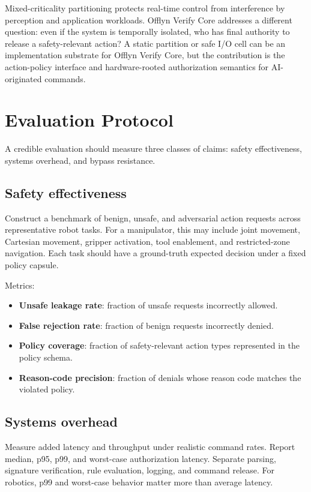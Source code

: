 \documentclass[10pt]{article}
\newcommand{\ovc}{Offlyn Verify Core\xspace}
\begin{document}
Mixed-criticality partitioning protects real-time control from interference by perception and application workloads. \ovc addresses a different question: even if the system is temporally isolated, who has final authority to release a safety-relevant action? A static partition or safe I/O cell can be an implementation substrate for \ovc, but the contribution is the action-policy interface and hardware-rooted authorization semantics for AI-originated commands.

\section{Evaluation Protocol}

A credible evaluation should measure three classes of claims: safety effectiveness, systems overhead, and bypass resistance.

\subsection{Safety effectiveness}

Construct a benchmark of benign, unsafe, and adversarial action requests across representative robot tasks. For a manipulator, this may include joint movement, Cartesian movement, gripper activation, tool enablement, and restricted-zone navigation. Each task should have a ground-truth expected decision under a fixed policy capsule.

Metrics:

\begin{itemize}[leftmargin=*]
  \item \textbf{Unsafe leakage rate}: fraction of unsafe requests incorrectly allowed.
  \item \textbf{False rejection rate}: fraction of benign requests incorrectly denied.
  \item \textbf{Policy coverage}: fraction of safety-relevant action types represented in the policy schema.
  \item \textbf{Reason-code precision}: fraction of denials whose reason code matches the violated policy.
\end{itemize}

\subsection{Systems overhead}

Measure added latency and throughput under realistic command rates. Report median, p95, p99, and worst-case authorization latency. Separate parsing, signature verification, rule evaluation, logging, and command release. For robotics, p99 and worst-case behavior matter more than average latency.
\end{document}
